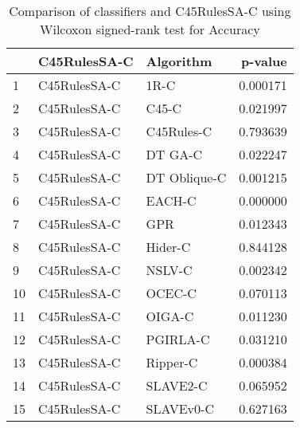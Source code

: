 \begin{table}
\footnotesize
\caption{Comparison of classifiers and C45RulesSA-C using Wilcoxon signed-rank test for Accuracy}
\label{tab:C45RulesSA-C wilcoxon Accuracy comparison}
\begin{tabular}{lllr}
\hline
 & C45RulesSA-C & Algorithm & p-value \\
\hline
1 & C45RulesSA-C & 1R-C & 0.000171 \\
2 & C45RulesSA-C & C45-C & 0.021997 \\
3 & C45RulesSA-C & C45Rules-C & 0.793639 \\
4 & C45RulesSA-C & DT GA-C & 0.022247 \\
5 & C45RulesSA-C & DT Oblique-C & 0.001215 \\
6 & C45RulesSA-C & EACH-C & 0.000000 \\
7 & C45RulesSA-C & GPR & 0.012343 \\
8 & C45RulesSA-C & Hider-C & 0.844128 \\
9 & C45RulesSA-C & NSLV-C & 0.002342 \\
10 & C45RulesSA-C & OCEC-C & 0.070113 \\
11 & C45RulesSA-C & OIGA-C & 0.011230 \\
12 & C45RulesSA-C & PGIRLA-C & 0.031210 \\
13 & C45RulesSA-C & Ripper-C & 0.000384 \\
14 & C45RulesSA-C & SLAVE2-C & 0.065952 \\
15 & C45RulesSA-C & SLAVEv0-C & 0.627163 \\
\hline
\end{tabular}
\end{table}
